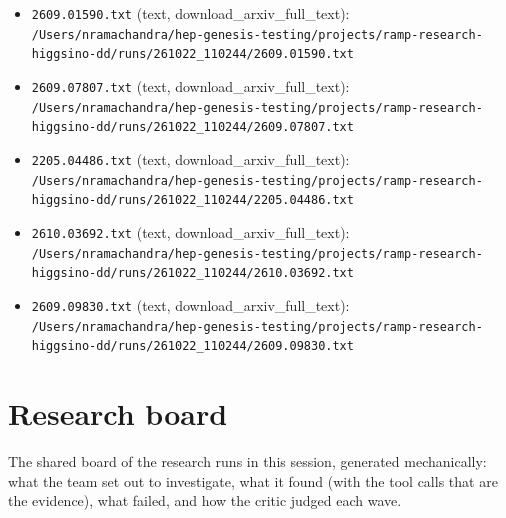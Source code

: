 \documentclass[11pt,a4paper]{article}
\begin{document}
\begin{itemize}
  \item \texttt{2609.01590.txt} (text, download\_arxiv\_full\_text): \texttt{/\allowbreak{}Users/\allowbreak{}nramachandra/\allowbreak{}hep-genesis-testing/\allowbreak{}projects/\allowbreak{}ramp-research-higgsino-dd/\allowbreak{}runs/\allowbreak{}261022\_\allowbreak{}110244/\allowbreak{}2609.01590.txt}
  \item \texttt{2609.07807.txt} (text, download\_arxiv\_full\_text): \texttt{/\allowbreak{}Users/\allowbreak{}nramachandra/\allowbreak{}hep-genesis-testing/\allowbreak{}projects/\allowbreak{}ramp-research-higgsino-dd/\allowbreak{}runs/\allowbreak{}261022\_\allowbreak{}110244/\allowbreak{}2609.07807.txt}
  \item \texttt{2205.04486.txt} (text, download\_arxiv\_full\_text): \texttt{/\allowbreak{}Users/\allowbreak{}nramachandra/\allowbreak{}hep-genesis-testing/\allowbreak{}projects/\allowbreak{}ramp-research-higgsino-dd/\allowbreak{}runs/\allowbreak{}261022\_\allowbreak{}110244/\allowbreak{}2205.04486.txt}
  \item \texttt{2610.03692.txt} (text, download\_arxiv\_full\_text): \texttt{/\allowbreak{}Users/\allowbreak{}nramachandra/\allowbreak{}hep-genesis-testing/\allowbreak{}projects/\allowbreak{}ramp-research-higgsino-dd/\allowbreak{}runs/\allowbreak{}261022\_\allowbreak{}110244/\allowbreak{}2610.03692.txt}
  \item \texttt{2609.09830.txt} (text, download\_arxiv\_full\_text): \texttt{/\allowbreak{}Users/\allowbreak{}nramachandra/\allowbreak{}hep-genesis-testing/\allowbreak{}projects/\allowbreak{}ramp-research-higgsino-dd/\allowbreak{}runs/\allowbreak{}261022\_\allowbreak{}110244/\allowbreak{}2609.09830.txt}
\end{itemize}

\section{Research board}
\label{app:board}
The shared board of the research runs in this session, generated mechanically: what the team set out to investigate, what it found (with the tool calls that are the evidence), what failed, and how the critic judged each wave.
\end{document}
